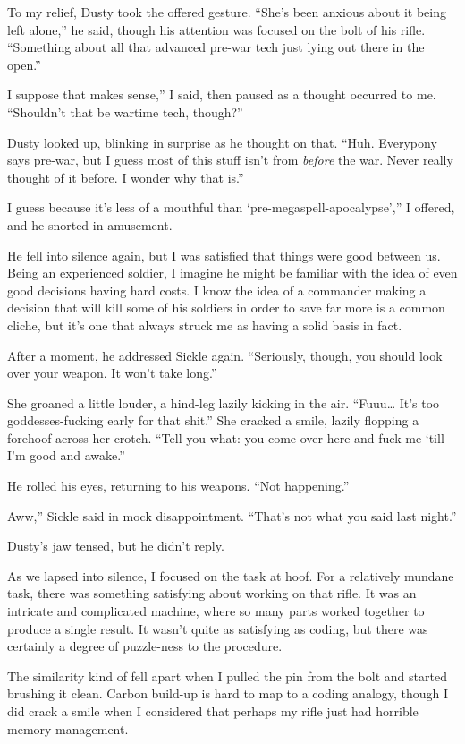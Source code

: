 To my relief, Dusty took the offered gesture. “She’s been anxious about it being left alone,” he said, though his attention was focused on the bolt of his rifle. “Something about all that advanced pre-war tech just lying out there in the open.”

\leavevmode{}I suppose that makes sense,” I said, then paused as a thought occurred to me. “Shouldn’t that be wartime tech, though?”

Dusty looked up, blinking in surprise as he thought on that. “Huh. Everypony says pre-war, but I guess most of this stuff isn’t from \textit{before} the war. Never really thought of it before. I wonder why that is.”

\leavevmode{}I guess because it’s less of a mouthful than ‘pre-megaspell-apocalypse’,” I offered, and he snorted in amusement.

He fell into silence again, but I was satisfied that things were good between us. Being an experienced soldier, I imagine he might be familiar with the idea of even good decisions having hard costs. I know the idea of a commander making a decision that will kill some of his soldiers in order to save far more is a common cliche, but it’s one that always struck me as having a solid basis in fact.

After a moment, he addressed Sickle again. “Seriously, though, you should look over your weapon. It won’t take long.”

She groaned a little louder, a hind-leg lazily kicking in the air. “Fuuu… It’s too goddesses-fucking early for that shit.” She cracked a smile, lazily flopping a forehoof across her crotch. “Tell you what: you come over here and fuck me ‘till I’m good and awake.”

He rolled his eyes, returning to his weapons. “Not happening.”

\leavevmode{}Aww,” Sickle said in mock disappointment. “That’s not what you said last night.”

Dusty’s jaw tensed, but he didn’t reply.

As we lapsed into silence, I focused on the task at hoof. For a relatively mundane task, there was something satisfying about working on that rifle. It was an intricate and complicated machine, where so many parts worked together to produce a single result. It wasn’t quite as satisfying as coding, but there was certainly a degree of puzzle-ness to the procedure.

The similarity kind of fell apart when I pulled the pin from the bolt and started brushing it clean. Carbon build-up is hard to map to a coding analogy, though I did crack a smile when I considered that perhaps my rifle just had horrible memory management.

